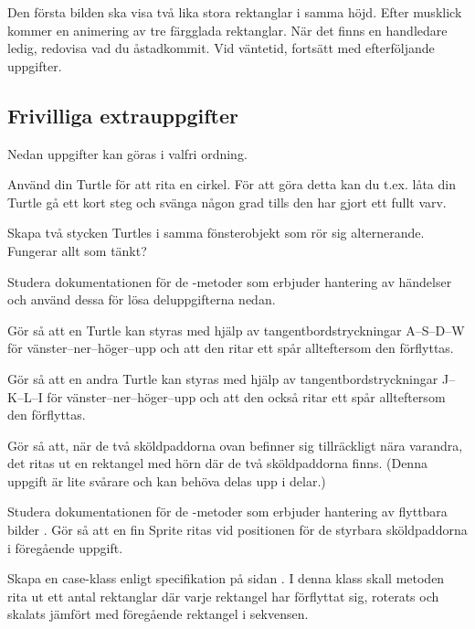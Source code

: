 Den första bilden ska visa två lika stora rektanglar i samma höjd. Efter musklick kommer en animering av tre färgglada rektanglar. När det finns en handledare ledig, redovisa vad du åstadkommit. Vid väntetid, fortsätt med efterföljande uppgifter.



\clearpage

\subsection{Frivilliga extrauppgifter}

Nedan uppgifter kan göras i valfri ordning.

\Task Använd din Turtle för att rita en cirkel. För att göra detta kan du t.ex. låta din Turtle gå ett kort steg och svänga någon grad tills den har gjort ett fullt varv.

\Task Skapa två stycken Turtles i samma fönsterobjekt som rör sig alternerande. Fungerar allt som tänkt?


\Task Studera dokumentationen för de -metoder som erbjuder hantering av händelser  och använd dessa för lösa deluppgifterna nedan.

\Subtask Gör så att en Turtle kan styras med hjälp av tangentbordstryckningar A--S--D--W för vänster--ner--höger--upp och att den ritar ett spår allteftersom den förflyttas.

\Subtask Gör så att en andra Turtle kan styras med hjälp av tangentbordstryckningar J--K--L--I för vänster--ner--höger--upp och att den också ritar ett spår allteftersom den förflyttas.

\Subtask Gör så att, när de två sköldpaddorna ovan befinner sig tillräckligt nära varandra, det ritas ut en rektangel med hörn där de två sköldpaddorna finns. (Denna uppgift är lite svårare och kan behöva delas upp i delar.)


\Task Studera dokumentationen för de -metoder som erbjuder hantering av flyttbara bilder . Gör så att en fin Sprite ritas vid positionen för de styrbara sköldpaddorna i föregående uppgift.


\Task Skapa en case-klass  enligt specifikation på sidan \pageref{code:classes:graphics:rectanglesequence}. I denna klass skall metoden  rita ut ett antal rektanglar där varje rektangel har förflyttat sig, roterats och skalats jämfört med föregående rektangel i sekvensen. 

